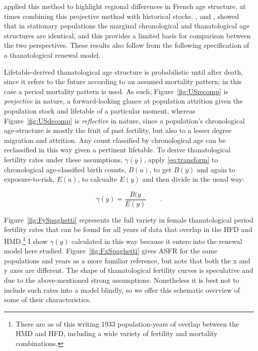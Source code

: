 \documentclass{article}
\newcommand{\ep}{\quad\quad\text{.}}
\begin{document}
\citet{brouard1986structure} applied this method to highlight regional
differences in French age structure, at times combining this projective method
with historical stocks. \citet{brouard1989mouvements}, and \citet{vaupel2009life}, showed that in stationary populations the
marginal chronological and thanatological age structures are identical, and this
provides a limited basis for comparison between the two perspectives. 
These results also follow from the following specification of a
thanatological renewal model.

Lifetable-derived thanatological age structure is
probabilistic until after death, since it refers to the future according to an
assumed mortality pattern; in this case a period mortality pattern is used.
As such, Figure~\ref{fig:USrecomp} is \textit{projective} in nature, a
forward-looking glance at population attrition given the population stock and lifetable of a
particular moment, whereas Figure~\ref{fig:USdecomp} is \textit{reflective} in
nature, since a population's chronological age-structure is mostly the fruit of past
fertility, but also to a lesser degree migration and attrition. Any count
classified by chronological age can be reclassified in this way given a
pertinent lifetable. To
derive thanatological fertility rates under these assumptions, $\gamma(y)$, apply \eqref{eq:transform} to
chronological age-classified birth counts, $B(a)$, to get $B(y)$ and again to
exposure-to-risk, $E(a)$, to calcualte $E(y)$ and then divide in the usual way:

\begin{equation}
\gamma(y) = \frac{B(y}{E(y)} \ep
\end{equation}

Figure~\ref{fig:FySpaghetti}
represents the full variety in female thanatological period fertility rates that can be found for all years
of data that overlap in the HFD and HMD.\footnote{There are as of this writing
1933 population-years of overlap between the HMD and HFD, including a wide
variety of fertility and mortality combinations.} I show $\gamma(y)$ calculated in this way because
it enters into the renewal model here studied. Figure~\ref{fig:FxSpaghetti}
gives ASFR for the same populations and years as a more familiar reference, but
note that both the x and y axes are different. The shape of thanatological
fertility curves is speculative and due to the above-mentioned strong assumptions. Nonetheless it is best not to
include such rates into a model blindly, so we offer this schematic overview of
some of their characteristics.
\end{document}
